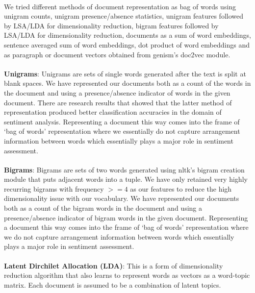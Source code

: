 \documentclass[a4paper,26pt]{article}
\begin{document}
\paragraph{}
We tried different methods of document representation as bag of words using unigram counts, unigram presence/absence statistics, unigram features followed by LSA/LDA for dimensionality reduction, bigram features followed by LSA/LDA for dimensionality reduction, documents as a sum of word embeddings, sentence averaged sum of word embeddings, dot product of word embeddings and as paragraph or document vectors obtained from genism's doc2vec module.

\paragraph{}
\textbf{Unigrams}: Unigrams are sets of single words generated after the text is split at blank spaces. We have represented our documents both as a count of the words in the document and using a presence/absence indicator of words in the given document. There are research results that showed that the latter method of representation produced better classification accuracies in the domain of sentiment analysis. Representing a document this way comes into the frame of `bag of words' representation where we essentially do not capture arrangement information between words which essentially plays a major role in sentiment assessment. 

\paragraph{}
\textbf{Bigrams}: Bigrams are sets of two words generated using nltk's bigram creation module that puts adjacent words into a tuple. We have only retained very highly recurring bigrams with frequency $>=4$ as our features to reduce the high dimensionality issue with our vocabulary. We have represented our documents both as a count of the bigram words in the document and using a presence/absence indicator of bigram words in the given document. Representing a document this way comes into the frame of `bag of words' representation where we do not capture arrangement information between words which essentially plays a major role in sentiment assessment. 

\paragraph{}
\textbf{Latent Dirchilet Allocation (LDA)}: This is a form of dimensionality reduction algorithm that also learns to represent words as vectors as a word-topic matrix. Each document is assumed to be a combination of latent topics.
\end{document}
